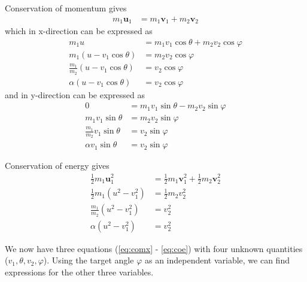 \documentclass[twoside,english]{uiofysmaster/uiofysmaster}
\begin{document}
\begin{appendices}
Conservation of momentum gives
\begin{align*}%
	m_1 \boldsymbol{u}_1 &= m_1 \boldsymbol{v}_1 + m_2 \boldsymbol{v}_2
\end{align*}
which in x-direction can be expressed as
\begin{align}\label{eq:comx}
	m_1 u &= m_1 v_1 \cos \theta + m_2 v_2 \cos \varphi  \nonumber\\
	m_1 (u - v_1 \cos \theta) &= m_2 v_2 \cos \varphi  \nonumber\\
	\frac{m_1}{m_2} (u - v_1 \cos \theta) &= v_2 \cos \varphi  \nonumber\\
	\alpha (u - v_1 \cos \theta) &= v_2 \cos \varphi
\end{align}
and in y-direction can be expressed as
\begin{align}\label{eq:comy}
	0 &= m_1 v_1 \sin \theta - m_2 v_2 \sin \varphi \nonumber\\
	m_1 v_1 \sin \theta &= m_2 v_2 \sin \varphi \nonumber\\
	\frac{m_1}{m_2} v_1 \sin \theta &= v_2 \sin \varphi \nonumber\\
	\alpha v_1 \sin \theta &= v_2 \sin \varphi
\end{align}

Conservation of energy gives
\begin{align}\label{eq:coe}
	\tfrac{1}{2} m_1 \boldsymbol{u}_1^2 &= \tfrac{1}{2} m_1 \boldsymbol{v}_1^2 + \tfrac{1}{2} m_2 \boldsymbol{v}_2^2 \nonumber\\
	\tfrac{1}{2} m_1 (u^2 - v_1^2) &= \tfrac{1}{2} m_2 v_2^2 \nonumber\\
	\frac{m_1}{m_2} (u^2 - v_1^2) &= v_2^2 \nonumber\\
	\alpha (u^2 - v_1^2) &= v_2^2
\end{align}

We now have three equations (\autoref{eq:comx} - \autoref{eq:coe}) with four unknown quantities ($v_1, \theta, v_2, \varphi$). Using the target angle $\varphi$ as an independent variable, we can find expressions for the other three variables. 


\end{appendices}
\end{document}
